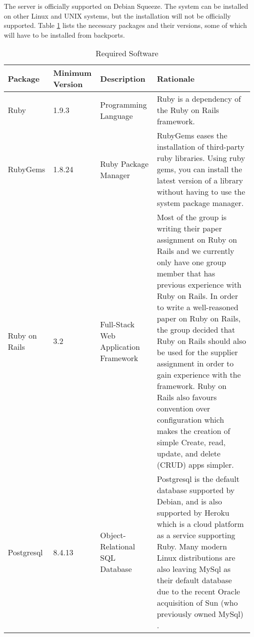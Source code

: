 The server is officially supported on Debian Squeeze. The system can be installed on other Linux and UNIX systems, but the installation will not be officially supported. Table \ref{serverRequirements} lists the necessary packages and their versions, some of which will have to be installed from backports.
\begin{table}[!h]
	\begin{tabular}{|p{2cm}|p{2cm}|p{3cm}|p{6cm}|}
		\hline
		\textbf{Package} & \textbf{Minimum Version} & \textbf{Description} & \textbf{Rationale} \\
		\hline
		Ruby & 1.9.3 & Programming Language & Ruby is a dependency of the Ruby on Rails framework. \\
		\hline
		RubyGems & 1.8.24 & Ruby Package Manager & RubyGems eases the installation of third-party ruby libraries. Using ruby gems, you can install the latest version of a library without having to use the system package manager. \\
		\hline
		Ruby on Rails & 3.2 & Full-Stack Web Application Framework & Most of the group is writing their paper assignment on Ruby on Rails and we currently only have one group member that has previous experience with Ruby on Rails. In order to write a well-reasoned paper on Ruby on Rails, the group decided that Ruby on Rails should also be used for the supplier assignment in order to gain experience with the framework. Ruby on Rails also favours convention over configuration which makes the creation of simple Create, read, update, and delete (CRUD) apps simpler. \\
		\hline
		Postgresql & 8.4.13 & Object-Relational SQL Database & Postgresql is the default database supported by Debian, and is also supported by Heroku which is a cloud platform as a service supporting Ruby. Many modern Linux distributions are also leaving MySql as their default database due to the recent Oracle acquisition of Sun (who previously owned MySql) \cite{fedoraMysql}. \\
		\hline
	\end{tabular}
	\caption{Required Software}
	\label{serverRequirements}
\end{table}

